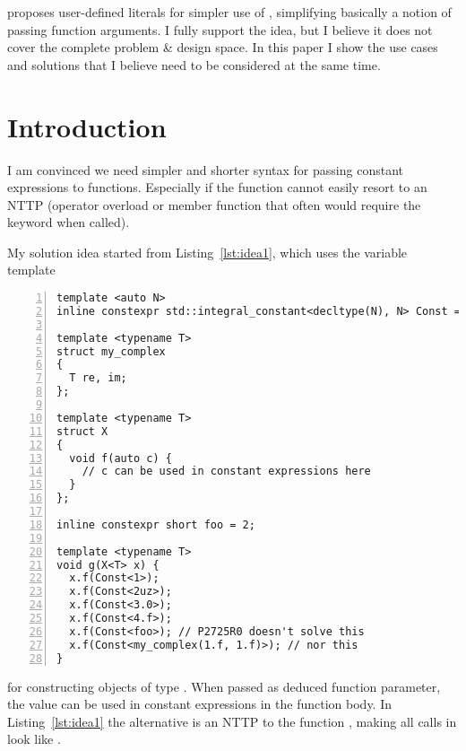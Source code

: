 \newcommand\wgTitle{\code{std::integral\_constant} literals do not suffice --- \code{constexpr\_t}?}
\newcommand\wgName{Matthias Kretz <m.kretz@gsi.de>}
\newcommand\wgDocumentNumber{P2772R0}
\newcommand\wgGroup{LEWG-I, LEWG}
\newcommand\wgTarget{\CC{}26}

\usepackage{mymacros}
\usepackage{wg21}
\usepackage{changelog}
\usepackage{underscore}



\renewcommand{\lst}[1]{Listing~\ref{#1}}
\renewcommand{\sect}[1]{Section~\ref{#1}}
\renewcommand{\ttref}[1]{Tony~Table~\ref{#1}}


\begin{wgTitlepage}
  \textcite{P2725R0} proposes user-defined literals for simpler use of
  , simplifying basically a notion of passing
   function arguments.
  I fully support the idea, but I believe it does not cover the complete
  problem \& design space.
  In this paper I show the use cases and solutions that I believe need to be
  considered at the same time.
\end{wgTitlepage}

\pagestyle{scrheadings}

%
%

\section{Introduction}
I am convinced we need simpler and shorter syntax for passing constant
expressions to functions.
Especially if the function cannot easily resort to an NTTP (operator overload
or member function that often would require the  keyword when
called).

My solution idea started from \lst{lst:idea1}, which uses the variable template
\begin{lstlisting}[numbers=left,float={hbtp},label=lst:idea1,caption={
    \code{integral_constant} from variable template
}]
template <auto N>
inline constexpr std::integral_constant<decltype(N), N> Const = {};

template <typename T>
struct my_complex
{
  T re, im;
};

template <typename T>
struct X
{
  void f(auto c) {
    // c can be used in constant expressions here
  }
};

inline constexpr short foo = 2;

template <typename T>
void g(X<T> x) {
  x.f(Const<1>);
  x.f(Const<2uz>);
  x.f(Const<3.0>);
  x.f(Const<4.f>);
  x.f(Const<foo>); // P2725R0 doesn't solve this
  x.f(Const<my_complex(1.f, 1.f)>); // nor this
}
\end{lstlisting}
 for constructing objects of type .
When passed as deduced function parameter, the value can be used in constant
expressions in the function body.
In \lst{lst:idea1} the alternative is an NTTP to the function , making
all calls in  look like .

